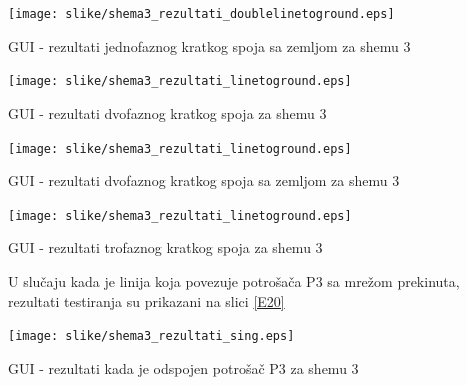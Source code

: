 \documentclass[a4paper, 12pt]{article}
\numberwithin{figure}{section}
\numberwithin{equation}{section}
\begin{document}
 \begin{center}
    \captionsetup{type=figure}
    \begin{center}
        \texttt{[image: slike/shema3\_rezultati\_doublelinetoground.eps]}
        \caption{GUI - rezultati jednofaznog kratkog spoja sa zemljom za shemu 3}
        \label{E16}
    \end{center}
\end{center}

\begin{center}
    \captionsetup{type=figure}
    \begin{center}
        \texttt{[image: slike/shema3\_rezultati\_linetoground.eps]}
        \caption{GUI - rezultati dvofaznog kratkog spoja za shemu 3}
        \label{E17}
    \end{center}
\end{center}

\begin{center}
    \captionsetup{type=figure}
    \begin{center}
        \texttt{[image: slike/shema3\_rezultati\_linetoground.eps]}
        \caption{GUI - rezultati dvofaznog kratkog spoja sa zemljom za shemu 3}
        \label{E18}
    \end{center}
\end{center}

\begin{center}
    \captionsetup{type=figure}
    \begin{center}
        \texttt{[image: slike/shema3\_rezultati\_linetoground.eps]}
        \caption{GUI - rezultati trofaznog kratkog spoja za shemu 3}
        \label{E19}
    \end{center}
\end{center}

U slučaju kada je linija koja povezuje potrošača P3 sa mrežom prekinuta, rezultati testiranja su prikazani na slici \ref{E20}

\begin{center}
    \captionsetup{type=figure}
    \begin{center}
        \texttt{[image: slike/shema3\_rezultati\_sing.eps]}
        \caption{GUI - rezultati kada je odspojen potrošač P3 za shemu 3}
        \label{E20}
    \end{center}
\end{center}
\end{document}
